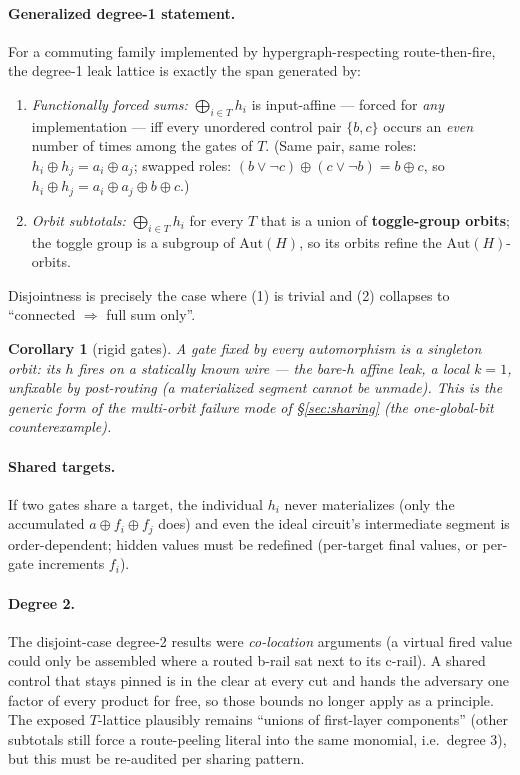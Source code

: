 \documentclass[11pt]{article}
\newtheorem{corollary}[theorem]{Corollary}
\theoremstyle{remark}
\begin{document}
\paragraph{Generalized degree-1 statement.} For a commuting family implemented by
hypergraph-respecting route-then-fire, the degree-1 leak lattice is exactly the span generated
by:
\begin{enumerate}
\item \emph{Functionally forced sums:} $\bigoplus_{i\in T}h_i$ is input-affine --- forced for
\emph{any} implementation --- iff every unordered control pair $\{b,c\}$ occurs an \emph{even}
number of times among the gates of $T$. (Same pair, same roles: $h_i\oplus h_j=a_i\oplus a_j$;
swapped roles: $(b\vee\neg c)\oplus(c\vee\neg b)=b\oplus c$, so
$h_i\oplus h_j=a_i\oplus a_j\oplus b\oplus c$.)
\item \emph{Orbit subtotals:} $\bigoplus_{i\in T}h_i$ for every $T$ that is a union of
\textbf{toggle-group orbits}; the toggle group is a subgroup of $\mathrm{Aut}(H)$, so its
orbits refine the $\mathrm{Aut}(H)$-orbits.
\end{enumerate}
Disjointness is precisely the case where (1) is trivial and (2) collapses to ``connected
$\Rightarrow$ full sum only''.

\begin{corollary}[rigid gates]
A gate fixed by every automorphism is a singleton orbit: its $h$ fires on a statically known
wire --- the bare-$h$ affine leak, a local $k=1$, unfixable by post-routing (a materialized
segment cannot be unmade). This is the generic form of the multi-orbit failure mode of
\S\ref{sec:sharing} (the one-global-bit counterexample).
\end{corollary}

\paragraph{Shared targets.} If two gates share a target, the individual $h_i$ never
materializes (only the accumulated $a\oplus f_i\oplus f_j$ does) and even the ideal circuit's
intermediate segment is order-dependent; hidden values must be redefined (per-target final
values, or per-gate increments $f_i$).

\paragraph{Degree 2.} The disjoint-case degree-2 results were \emph{co-location} arguments (a
virtual fired value could only be assembled where a routed b-rail sat next to its c-rail). A
shared control that stays pinned is in the clear at every cut and hands the adversary one factor
of every product for free, so those bounds no longer apply as a principle. The exposed
$T$-lattice plausibly remains ``unions of first-layer components'' (other subtotals still force
a route-peeling literal into the same monomial, i.e.\ degree 3), but this must be re-audited
per sharing pattern.
\end{document}
